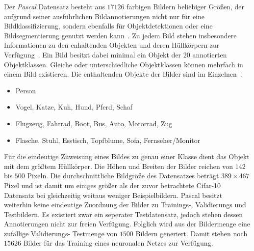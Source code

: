 Der \emph{\gls{Pascal}} Datensatz besteht aus $17126$ farbigen Bildern beliebiger Größen, der aufgrund seiner ausführlichen Bildannotierungen nicht nur für eine Bildklassifizierung, sondern ebenfalls für Objektdetektionen oder eine Bildsegmentierung genutzt werden kann~\cite{pascal_voc}.
Zu jedem Bild stehen insbesondere Informationen zu den enhaltenden Objekten und deren Hüllkörpern zur Verfügung~\cite{pascal_voc}.
Ein Bild besitzt dabei minimal ein Objekt der $20$ annotierten Objektklassen.
Gleiche oder unterschiedliche Objektklassen können mehrfach in einem Bild existieren.
Die enthaltenden Objekte der Bilder sind im Einzelnen~\cite{pascal_voc}:
\begin{itemize}
  \item Person
  \item Vogel, Katze, Kuh, Hund, Pferd, Schaf
  \item Flugzeug, Fahrrad, Boot, Bus, Auto, Motorrad, Zug
  \item Flasche, Stuhl, Esstisch, Topfblume, Sofa, Fernseher/Monitor
\end{itemize}
Für die eindeutige Zuweisung eines Bildes zu genau einer Klasse dient das Objekt mit dem größtem Hüllkörper.
Die Höhen und Breiten der Bilder reichen von $142$ bis $500$ Pixeln.
Die durchschnittliche Bildgröße des Datensatzes beträgt $389 \times 467$ Pixel und ist damit um einiges größer als der zuvor betrachtete \gls{Cifar}-10 Datensatz bei gleichzeitig weitaus weniger Beispielbildern.
\gls{Pascal} besitzt weiterhin keine eindeutige Zuordnung der Bilder zu Trainings-, Validierungs und Testbildern.
Es existiert zwar ein seperater Testdatensatz, jedoch stehen dessen Annotierungen nicht zur freien Verfügung.
Folglich wird aus der Bildermenge eine zufällige Validierungs- \bzw{} Testmenge von $1500$ Bildern generiert.
Damit stehen noch $15626$ Bilder für das Training eines neuronalen Netzes zur Verfügung.

